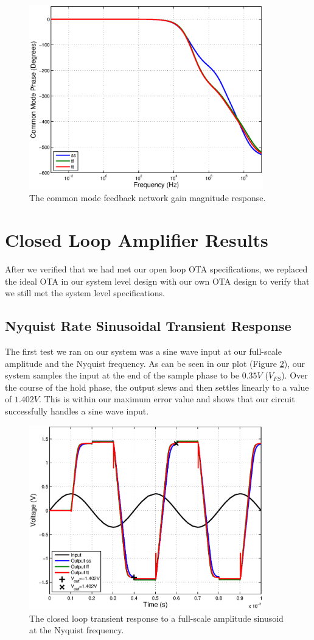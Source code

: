 \documentclass[journal]{IEEEtran}
\begin{document}
\begin{figure}
\centering
\includegraphics[width=4in]{Plots/open_cm_phase.eps}
\caption{The common mode feedback network gain magnitude response.}
\label{fig:open_cmfb_phase}
\end{figure}


\section{Closed Loop Amplifier Results}
After we verified that we had met our open loop OTA specifications, we replaced the ideal OTA in our system level design with our own OTA design to verify that we still met the system level specifications.

\subsection{Nyquist Rate Sinusoidal Transient Response}
The first test we ran on our system was a sine wave input at our full-scale amplitude and the Nyquist frequency. As can be seen in our plot (Figure \ref{fig:closed_sine}), our system samples the input at the end of the sample phase to be $0.35V$ ($V_{FS}$). Over the course of the hold phase, the output slews and then settles linearly to a value of $1.402V$. This is within our maximum error value and shows that our circuit successfully handles a sine wave input. 

\begin{figure}
\centering
\includegraphics[width=4in]{Plots/closed_sine.eps}
\caption{The closed loop transient response to a full-scale amplitude sinusoid at the Nyquist frequency.}
\label{fig:closed_sine}
\end{figure}
\end{document}
